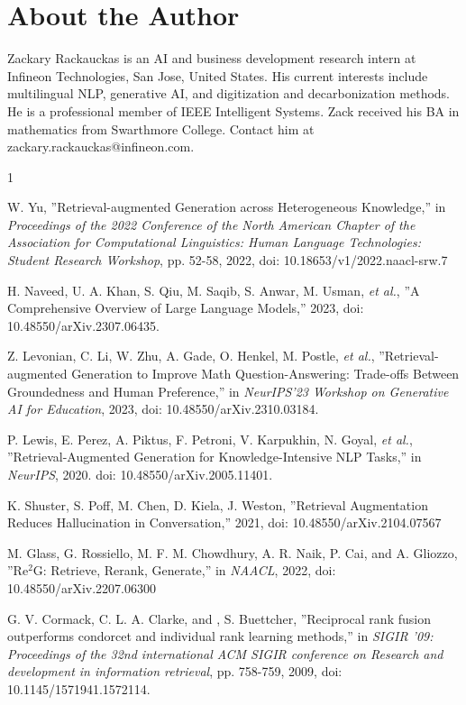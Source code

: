 \documentclass{article}
\begin{document}
\section*{About the Author}
Zackary Rackauckas is an AI and business development research intern at Infineon Technologies, San Jose, United States. His current interests include multilingual NLP, generative AI, and digitization and decarbonization methods. He is a professional member of IEEE Intelligent Systems. Zack received his BA in mathematics from Swarthmore College. Contact him at zackary.rackauckas@infineon.com.

\begin{thebibliography}{1}

W. Yu, ''Retrieval-augmented Generation across Heterogeneous Knowledge,'' in {\it Proceedings of the 2022 Conference of the North American Chapter of the Association for Computational Linguistics: Human Language Technologies: Student Research Workshop}, pp. 52-58, 2022, doi: 10.18653/v1/2022.naacl-srw.7

H. Naveed, U. A. Khan, S. Qiu, M. Saqib, S. Anwar, M. Usman, \textit{et al.}, ''A Comprehensive Overview of Large Language Models,'' 2023, doi: 10.48550/arXiv.2307.06435.

Z. Levonian, C. Li, W. Zhu, A. Gade, O. Henkel, M. Postle, \textit{et al.}, ''Retrieval-augmented Generation to Improve Math Question-Answering: Trade-offs Between Groundedness and Human Preference,'' in {\it NeurIPS'23 Workshop on Generative AI for Education}, 2023, doi: 10.48550/arXiv.2310.03184.

P. Lewis, E. Perez, A. Piktus, F. Petroni, V. Karpukhin, N. Goyal, \textit{et al.}, ''Retrieval-Augmented Generation for Knowledge-Intensive NLP Tasks,'' in {\it NeurIPS}, 2020. doi: 10.48550/arXiv.2005.11401.

K. Shuster, S. Poff, M. Chen, D. Kiela, J. Weston, ''Retrieval Augmentation Reduces Hallucination in Conversation,'' 2021, doi: 10.48550/arXiv.2104.07567

M. Glass, G. Rossiello, M. F. M. Chowdhury, A. R. Naik, P. Cai, and A. Gliozzo, ''Re$^2$G: Retrieve, Rerank, Generate,'' in {\it NAACL}, 2022, doi: 10.48550/arXiv.2207.06300

G. V. Cormack, C. L. A. Clarke, and , S. Buettcher, ''Reciprocal rank fusion outperforms condorcet and individual rank learning methods,'' in {\it SIGIR '09: Proceedings of the 32nd international ACM SIGIR conference on Research and development in information retrieval}, pp. 758-759, 2009, doi: 10.1145/1571941.1572114.


\end{thebibliography}
\end{document}
